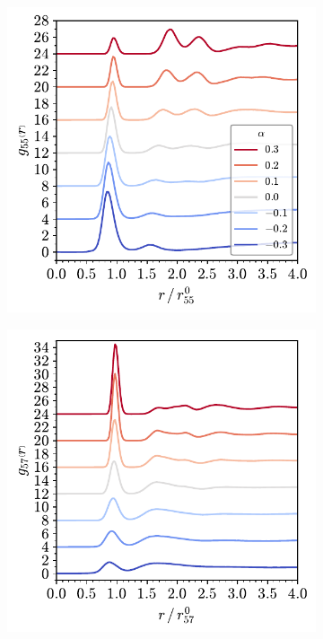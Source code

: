 \begin{figure}[bt]
     \begin{subfigure}[b]{0.45\textwidth}
         \centering
         \includegraphics[width=\textwidth]{./figures/targeted_opt/partial_gr_55_567.pdf}
         \caption{}
         \label{fig:toptrdf1}
     \end{subfigure}
     \hfill
     \begin{subfigure}[b]{0.45\textwidth}
         \centering
         \includegraphics[width=\textwidth]{./figures/targeted_opt/partial_gr_57_567.pdf}
         \caption{}
         \label{fig:toptrdf2}
     \end{subfigure}
     

\end{figure}
